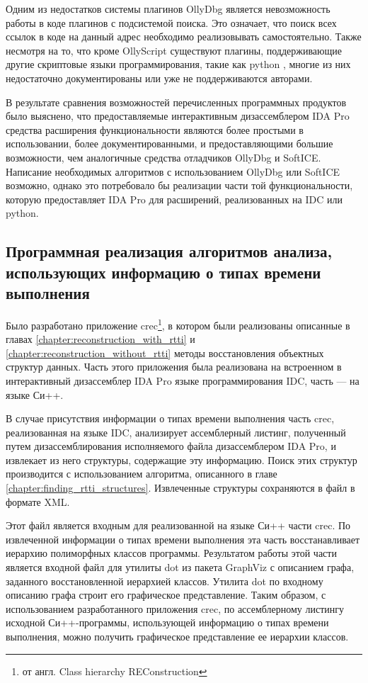 Одним из недостатков системы плагинов OllyDbg является невозможность работы в коде плагинов с подсистемой поиска. Это означает, что поиск всех ссылок в коде на данный адрес необходимо реализовывать самостоятельно. Также несмотря на то, что кроме OllyScript существуют плагины, поддерживающие другие скриптовые языки программирования, такие как python \cite{ollypython}, многие из них недостаточно документированы или уже не поддерживаются авторами.

В результате сравнения возможностей перечисленных программных продуктов было выяснено, что предоставляемые интерактивным дизассемблером IDA Pro средства расширения функциональности являются более простыми в использовании, более документированными, и предоставляющими большие возможности, чем аналогичные средства отладчиков OllyDbg и SoftICE. Написание необходимых алгоритмов с использованием OllyDbg или SoftICE возможно, однако это потребовало бы реализации части той функциональности, которую предоставляет IDA Pro для расширений, реализованных на IDC или python.



\subsection{Программная реализация алгоритмов анализа, использующих информацию о типах времени выполнения}\label{chapter:impl_with_rtti}
Было разработано приложение crec\footnote{от англ. Class hierarchy REConstruction}, в котором были реализованы описанные в главах \ref{chapter:reconstruction_with_rtti} и \ref{chapter:reconstruction_without_rtti} методы восстановления объектных структур данных. Часть этого приложения была реализована на встроенном в интерактивный дизассемблер IDA Pro языке программирования IDC, часть --- на языке Си++.

В случае присутствия информации о типах времени выполнения часть crec, реализованная на языке IDC, анализирует ассемблерный листинг, полученный путем дизассемблирования исполняемого файла дизассемблером IDA Pro, и извлекает из него структуры, содержащие эту информацию. Поиск этих структур производится с использованием алгоритма, описанного в главе \ref{chapter:finding_rtti_structures}. Извлеченные структуры сохраняются в файл в формате XML.

Этот файл является входным для реализованной на языке Си++ части crec. По извлеченной информации о типах времени выполнения эта часть восстанавливает иерархию полиморфных классов программы. Результатом работы этой части является входной файл для утилиты dot из пакета GraphViz \cite{graphviz} с описанием графа, заданного восстановленной иерархией классов. Утилита dot по входному описанию графа строит его графическое представление. Таким образом, с использованием разработанного приложения crec, по ассемблерному листингу исходной Си++-программы, использующей информацию о типах времени выполнения, можно получить графическое представление ее иерархии классов.


